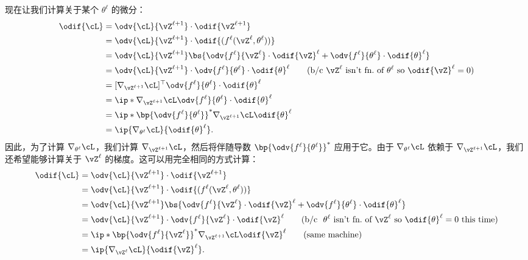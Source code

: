 \documentclass[../../book-main_zh.tex]{subfiles}
\begin{document}
现在让我们计算关于某个 \(\theta^{\ell}\) 的微分：
\begin{align}
    \odif{\cL}
    &= \odv{\cL}{\vZ^{\ell + 1}}\cdot \odif{\vZ^{\ell + 1}} \\
    &= \odv{\cL}{\vZ^{\ell + 1}}\cdot \odif{{(f^{\ell}(\vZ^{\ell},
    \theta^{\ell}))}} \\
    &= \odv{\cL}{\vZ^{\ell +
    1}}\bs{\odv{f^{\ell}}{\vZ^{\ell}}\cdot\odif{\vZ}^{\ell} +
    \odv{f^{\ell}}{\theta^{\ell}}\cdot\odif{\theta}^{\ell}} \\
    &= \odv{\cL}{\vZ^{\ell + 1}}\cdot
    \odv{f^{\ell}}{\theta^{\ell}}\cdot\odif{\theta}^{\ell} \qquad
    \text{(b/c~\(\vZ^{\ell}\) isn't fn.~of \(\theta^{\ell}\) so
    \(\odif{\vZ}^{\ell} = 0\))} \\
    &= [\nabla_{\vZ^{\ell +
    1}}\cL]^{\top}\odv{f^{\ell}}{\theta^{\ell}}\cdot\odif{\theta}^{\ell} \\
    &= \ip*{\nabla_{\vZ^{\ell +
    1}}\cL}{\odv{f^{\ell}}{\theta^{\ell}}\cdot\odif{\theta}^{\ell}} \\
    &= \ip*{\bp{\odv{f^{\ell}}{\theta^{\ell}}}^{*}\nabla_{\vZ^{\ell +
    1}}\cL}{\odif{\theta}^{\ell}} \\
    &= \ip{\nabla_{\theta^{\ell}}\cL}{\odif{\theta}^{\ell}}.
\end{align}
因此，为了计算 \(\nabla_{\theta^{\ell}}\cL\)，我们计算 \(\nabla_{\vZ^{\ell + 1}}\cL\)，然后将伴随导数 \(\bp{\odv{f^{\ell}}{\theta^{\ell}}}^{*}\) 应用于它。由于 \(\nabla_{\theta^{\ell}}\cL\) 依赖于 \(\nabla_{\vZ^{\ell +
1}}\cL\)，我们还希望能够计算关于 \(\vZ^{\ell}\) 的梯度。这可以用完全相同的方式计算：
\begin{align}
    \odif{\cL}
    &= \odv{\cL}{\vZ^{\ell + 1}}\cdot \odif{\vZ^{\ell + 1}} \\
    &= \odv{\cL}{\vZ^{\ell + 1}}\cdot\odif{{(f^{\ell}(\vZ^{\ell},
    \theta^{\ell}))}} \\
    &= \odv{\cL}{\vZ^{\ell +
    1}}\bs{\odv{f^{\ell}}{\vZ^{\ell}}\cdot\odif{\vZ}^{\ell} +
    \odv{f^{\ell}}{\theta^{\ell}}\cdot\odif{\theta}^{\ell}} \\
    &= \odv{\cL}{\vZ^{\ell +
    1}}\cdot\odv{f^{\ell}}{\vZ^{\ell}}\cdot\odif{\vZ}^{\ell} \qquad
    \text{(b/c~~\(\theta^{\ell}\) isn't fn.~of \(\vZ^{\ell}\) so
    \(\odif{\theta}^{\ell} = 0\) this time)} \\
    &= \ip*{\bp{\odv{f^{\ell}}{\vZ^{\ell}}}^{*}\nabla_{\vZ^{\ell +
    1}}\cL}{\odif{\vZ}^{\ell}} \qquad \text{(same machine)} \\
    &= \ip{\nabla_{\vZ^{\ell}}\cL}{\odif{\vZ}^{\ell}}.
\end{align}
\end{document}
